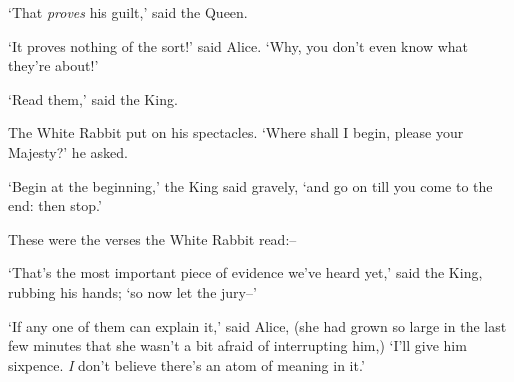   `That {\it proves} his guilt,' said the Queen.

  `It proves nothing of the sort!' said Alice.  `Why, you don't
even know what they're about!'

  `Read them,' said the King.

  The White Rabbit put on his spectacles.  `Where shall I begin,
please your Majesty?' he asked.

  `Begin at the beginning,' the King said gravely, `and go on
till you come to the end:  then stop.'

  These were the verses the White Rabbit read:--
\onelineskip
{}
\onelineskip

\onelineskip

\onelineskip

\onelineskip

\onelineskip

\onelineskip

  `That's the most important piece of evidence we've heard yet,'
said the King, rubbing his hands; `so now let the jury--'

  `If any one of them can explain it,' said Alice, (she had
grown so large in the last few minutes that she wasn't a bit
afraid of interrupting him,) `I'll give him sixpence.  {\it I} don't
believe there's an atom of meaning in it.'

